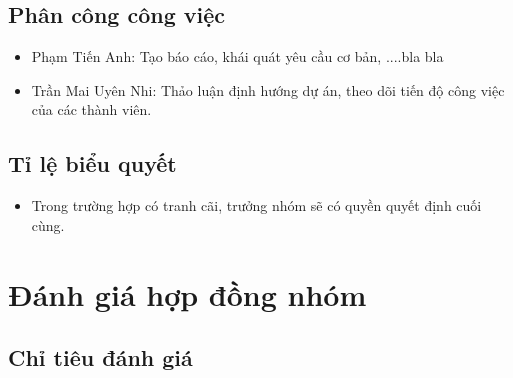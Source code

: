 \documentclass[a4paper, 12pt]{article}
\begin{document}
\subsection{Phân công công việc}
\begin{itemize}
    \item Phạm Tiến Anh: Tạo báo cáo, khái quát yêu cầu cơ bản, ....bla bla
    \item Trần Mai Uyên Nhi: Thảo luận định hướng dự án, theo dõi tiến độ công việc của các thành viên.

\end{itemize}

\subsection{Tỉ lệ biểu quyết}
\begin{itemize}
    \item Trong trường hợp có tranh cãi, trưởng nhóm sẽ có quyền quyết định cuối cùng.
\end{itemize}

\newpage
\section{Đánh giá hợp đồng nhóm}
\subsection{Chỉ tiêu đánh giá}
\end{document}

